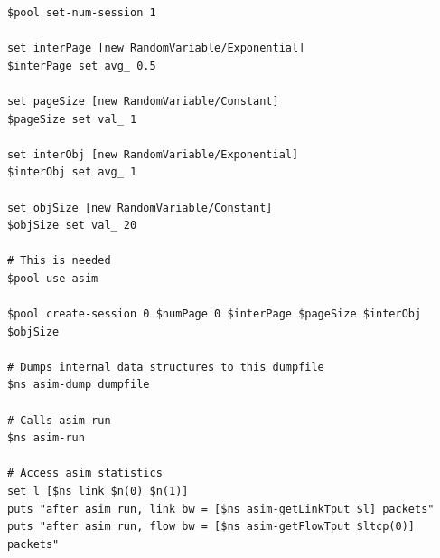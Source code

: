 \begin{verbatim}
$pool set-num-session 1

set interPage [new RandomVariable/Exponential]
$interPage set avg_ 0.5

set pageSize [new RandomVariable/Constant]
$pageSize set val_ 1

set interObj [new RandomVariable/Exponential]
$interObj set avg_ 1

set objSize [new RandomVariable/Constant]
$objSize set val_ 20

# This is needed
$pool use-asim

$pool create-session 0 $numPage 0 $interPage $pageSize $interObj $objSize

# Dumps internal data structures to this dumpfile
$ns asim-dump dumpfile

# Calls asim-run 
$ns asim-run

# Access asim statistics
set l [$ns link $n(0) $n(1)]
puts "after asim run, link bw = [$ns asim-getLinkTput $l] packets"
puts "after asim run, flow bw = [$ns asim-getFlowTput $ltcp(0)] packets"

\end{verbatim}










